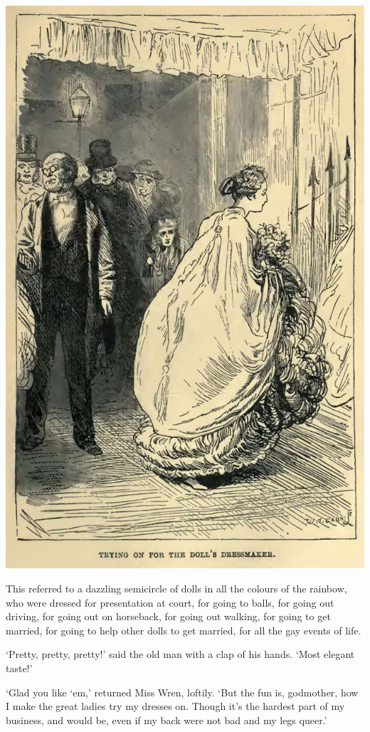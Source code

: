 \includegraphics[scale=2.3]{03-02-01}

This referred to a dazzling semicircle of dolls in all the colours of
the rainbow, who were dressed for presentation at court, for going to
balls, for going out driving, for going out on horseback, for going out
walking, for going to get married, for going to help other dolls to get
married, for all the gay events of life.

‘Pretty, pretty, pretty!’ said the old man with a clap of his hands.
‘Most elegant taste!’

‘Glad you like ‘em,’ returned Miss Wren, loftily. ‘But the fun is,
godmother, how I make the great ladies try my dresses on. Though it’s
the hardest part of my business, and would be, even if my back were not
bad and my legs queer.’

